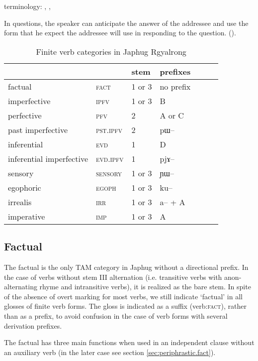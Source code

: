\documentclass[oldfontcommands,oneside,a4paper,11pt]{article}
\newcommand{\ipa}[1]{{\phon \mbox{#1}}} %
\newcommand{\factual}[1]{\textsc{:fact}}
\begin{document}
 terminology: \citet{tournadre14evidentiality},  \citet{tournadre08conjunct}, 
 
 
 In questions,  the speaker can anticipate the answer of the addressee
and use the form that he expect the addressee will use in responding to the question. (\citealt[244]{tournadre14evidentiality}).
 
 

\begin{table}
\caption{Finite verb categories in Japhug Rgyalrong} \label{tab:finite.forms} \centering
\begin{tabular}{lllllll}
\toprule
&	&	stem&	prefixes\\
\midrule
factual&	\textsc{fact} &	1 or 3&	no prefix\\
imperfective&	\textsc{ipfv} &	1 or 3&	B\\
perfective&	\textsc{pfv} &	2&	A or C\\
past imperfective&	\textsc{pst.ipfv} &	2&	\ipa{pɯ--}\\
inferential&	\textsc{evd} &	1&	D\\
inferential imperfective&	\textsc{evd.ipfv} &	1&	\ipa{pjɤ--}\\
sensory&	\textsc{sensory} &	1 or 3&	\ipa{ɲɯ--}\\
egophoric&	\textsc{egoph} &	1 or 3&	\ipa{ku--}\\
irrealis&	\textsc{irr} &	1 or 3&	\ipa{a--} + A\\
imperative&	\textsc{imp} &	1 or 3&	A\\
\bottomrule
\end{tabular}
\end{table}

 

\subsection{Factual}

The factual is the only TAM category in Japhug without a directional prefix. In the case of verbs without stem III alternation (i.e. transitive verbs with anon-alternating rhyme and intransitive verbs), it is realized as the bare stem. In spite of the absence of overt marking for most verbs, we still indicate `factual' in all glosses of finite verb forms. The gloss is indicated as a suffix (verb\factual{}), rather than as a prefix, to avoid confusion in the case of verb forms with several derivation prefixes.

The factual has three main functions when used in an independent clause without an auxiliary verb (in the later case see section \ref{sec:periphrastic.fact}). 
\end{document}
